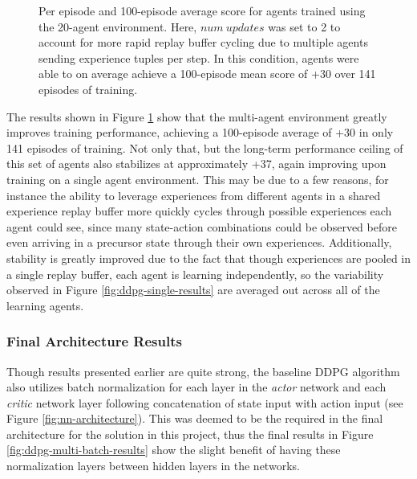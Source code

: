 \documentclass[11pt]{article}
\begin{document}
	\FloatBarrier
	
	\begin{figure}[!ht]
		\centering
		\caption{Per episode and 100-episode average score for agents trained using the 20-agent environment. Here, $num\ updates$ was set to 2 to account for more rapid replay buffer cycling due to multiple agents sending experience tuples per step. In this condition, agents were able to on average achieve a 100-episode mean score of +30 over 141 episodes of training.}
		\label{fig:ddpg-multi-results}
	\end{figure}
	
	\FloatBarrier
	
	The results shown in Figure \ref{fig:ddpg-multi-results} show that the multi-agent environment greatly improves training performance, achieving a 100-episode average of +30 in only 141 episodes of training. Not only that, but the long-term performance ceiling of this set of agents also stabilizes at approximately +37, again improving upon training on a single agent environment. This may be due to a few reasons, for instance the ability to leverage experiences from different agents in a shared experience replay buffer more quickly cycles through possible experiences each agent could see, since many state-action combinations could be observed before even arriving in a precursor state through their own experiences. Additionally, stability is greatly improved due to the fact that though experiences are pooled in a single replay buffer, each agent is learning independently, so the variability observed in Figure \ref{fig:ddpg-single-results} are averaged out across all of the learning agents.
	
	\subsubsection{Final Architecture Results}
	
	Though results presented earlier are quite strong, the baseline DDPG algorithm also utilizes batch normalization for each layer in the \textit{actor} network and each \textit{critic} network layer following concatenation of state input with action input (see Figure \ref{fig:nn-architecture}). This was deemed to be the required in the final architecture for the solution in this project, thus the final results in Figure \ref{fig:ddpg-multi-batch-results} show the slight benefit of having these normalization layers between hidden layers in the networks.
	
\end{document}
